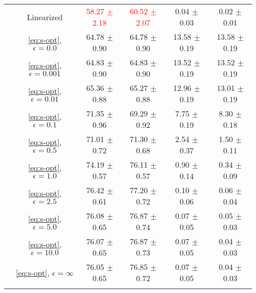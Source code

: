 \begin{table}[h]
\begin{adjustbox}{max width=1\textwidth,center}
\begin{tabular}{cccccc}
& Linearized & \textcolor{red}{58.27 $\pm$ 2.18} & \textcolor{red}{60.52 $\pm$ 2.07 }  & 0.04 $\pm$ 0.03 & 0.02 $\pm$ 0.01  \\ 
    & \ref{eq:s-opt}, $\epsilon=0.0$  & 64.78 $\pm$ 0.90 & 64.78 $\pm$ 0.90   & 13.58 $\pm$ 0.19 & 13.58 $\pm$ 0.19  \\
& \ref{eq:s-opt}, $\epsilon=0.001$  & 64.83 $\pm$ 0.90 & 64.83 $\pm$ 0.90   & 13.52 $\pm$ 0.19 & 13.52 $\pm$ 0.19  \\
 & \ref{eq:s-opt}, $\epsilon=0.01$  & 65.36 $\pm$ 0.88 & 65.27 $\pm$ 0.88   & 12.96 $\pm$ 0.19 & 13.01 $\pm$ 0.19  \\
 & \ref{eq:s-opt}, $\epsilon=0.1$  & 71.35 $\pm$ 0.96 & 69.29 $\pm$ 0.92   & 7.75 $\pm$ 0.19 & 8.30 $\pm$ 0.18\\
 & \ref{eq:s-opt}, $\epsilon=0.5$  & 71.01 $\pm$ 0.72 & 71.30 $\pm$ 0.68   & 2.54 $\pm$ 0.37 & 1.50 $\pm$ 0.11  \\
 & \ref{eq:s-opt}, $\epsilon=1.0$  & 74.19 $\pm$ 0.57 & 76.11 $\pm$ 0.57   & 0.90 $\pm$ 0.14 & 0.34 $\pm$ 0.09  \\
 & \ref{eq:s-opt}, $\epsilon=2.5$  & 76.42 $\pm$ 0.61 & 77.20 $\pm$ 0.72   & 0.10 $\pm$ 0.06 & 0.06 $\pm$ 0.04  \\
 & \ref{eq:s-opt}, $\epsilon=5.0$  & 76.08 $\pm$ 0.65 & 76.87 $\pm$ 0.74   & 0.07 $\pm$ 0.05 & 0.05 $\pm$ 0.03\\
 & \ref{eq:s-opt}, $\epsilon=10.0$  & 76.07 $\pm$ 0.65 & 76.87 $\pm$ 0.73   & 0.07 $\pm$ 0.05 & 0.04 $\pm$ 0.03\\
 & \ref{eq:s-opt}, $\epsilon=\infty$  & 76.05 $\pm$ 0.65 & 76.85 $\pm$ 0.72   & 0.07 $\pm$ 0.05 & 0.04 $\pm$ 0.03\\
 \bottomrule
    \addtocounter{table}{-1} %
    \end{tabular}
    \end{adjustbox}
\end{table}


